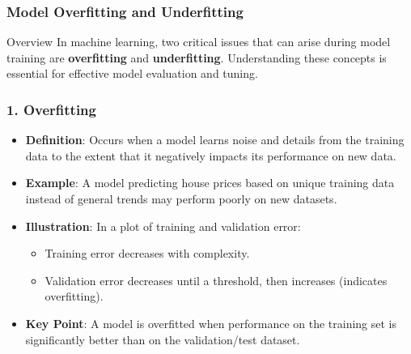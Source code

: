 \documentclass[aspectratio=169]{beamer}
\begin{document}
\begin{frame}[fragile]
  \frametitle{Model Overfitting and Underfitting}
  \begin{block}{Overview}
    In machine learning, two critical issues that can arise during model training are 
    \textbf{overfitting} and \textbf{underfitting}. Understanding these concepts is essential 
    for effective model evaluation and tuning.
  \end{block}
\end{frame}

\begin{frame}[fragile]
  \frametitle{1. Overfitting}
  \begin{itemize}
    \item \textbf{Definition}: Occurs when a model learns noise and details from the 
    training data to the extent that it negatively impacts its performance on new data.
    
    \item \textbf{Example}: A model predicting house prices based on unique training data 
    instead of general trends may perform poorly on new datasets.
    
    \item \textbf{Illustration}: In a plot of training and validation error:
    \begin{itemize}
      \item Training error decreases with complexity.
      \item Validation error decreases until a threshold, then increases (indicates overfitting).
    \end{itemize}
    
    \item \textbf{Key Point}: A model is overfitted when performance on the training set 
    is significantly better than on the validation/test dataset.
  \end{itemize}
\end{frame}
\end{document}
